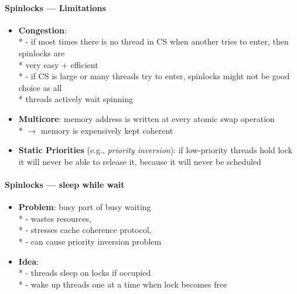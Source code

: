 \paragraph{Spinlocks --- Limitations}
\begin{itemize}
  \item \textbf{Congestion}: \\*
    - if most times there is no thread in CS when another tries to enter, then spinlocks are \\* \phantom{-} \phantom{\( \cdot \)} very easy + efficient \\*
    - if CS is large or many threads try to enter, spinlocks might not be good choice as all \\* \phantom{-} \phantom{\( \cdot \)} threads actively wait spinning
  \item \textbf{Multicore}: memory address is written at every atomic swap operation \\*
    \( \to \) memory is expensively kept coherent 
  \item \textbf{Static Priorities} (e.g., \emph{priority inversion}): if low-priority threads hold lock it will never be able to release it, because it will never be scheduled
\end{itemize}

\paragraph{Spinlocks --- sleep while wait}
\begin{itemize}
  \item \textbf{Problem}: busy part of busy waiting \\*
    - wastes resources, \\*
    - stresses cache coherence protocol, \\*
    - can cause priority inversion problem
  \item \textbf{Idea}: \\*
    - threads sleep on locks if occupied \\*
    - wake up threads one at a time when lock becomes free
\end{itemize}

